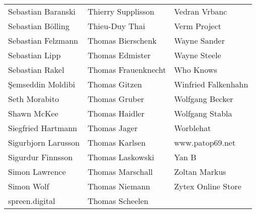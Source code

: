 \begin{tabular}{p{4.5cm}p{4.5cm}p{4.5cm}}
Sebastian Baranski & Thierry Supplisson & Vedran Vrbanc \\
Sebastian Bölling & Thieu-Duy Thai & Verm Project \\
Sebastian Felzmann & Thomas Bierschenk & Wayne Sander \\
Sebastian Lipp & Thomas Edmister & Wayne Steele \\
Sebastian Rakel & Thomas Frauenknecht & Who Knows \\
Şemseddin Moldibi & Thomas Gitzen & Winfried Falkenhahn \\
Seth Morabito & Thomas Gruber & Wolfgang Becker \\
Shawn McKee & Thomas Haidler & Wolfgang Stabla \\
Siegfried Hartmann & Thomas Jager & Worblehat \\
Sigurbjorn Larusson & Thomas Karlsen & www.patop69.net \\
Sigurdur Finnsson & Thomas Laskowski & Yan B \\
Simon Lawrence & Thomas Marschall & Zoltan Markus \\
Simon Wolf & Thomas Niemann & Zytex Online Store \\
spreen.digital & Thomas Scheelen &  \\
\end{tabular}
